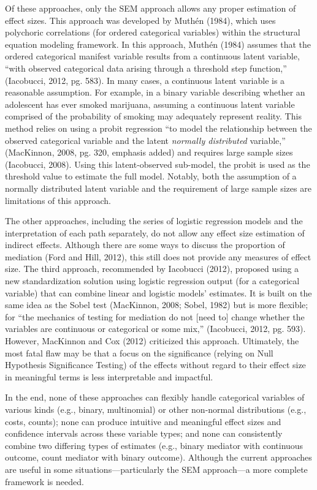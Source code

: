 \documentclass[]{DissertateUSU}
\begin{document}
Of these approaches, only the SEM approach allows any proper estimation
of effect sizes. This approach was developed by Muthén (1984), which
uses polychoric correlations (for ordered categorical variables) within
the structural equation modeling framework. In this approach, Muthén
(1984) assumes that the ordered categorical manifest variable results
from a continuous latent variable, ``with observed categorical data
arising through a threshold step function,'' (Iacobucci, 2012, pg. 583).
In many cases, a continuous latent variable is a reasonable assumption.
For example, in a binary variable describing whether an adolescent has
ever smoked marijuana, assuming a continuous latent variable comprised
of the probability of smoking may adequately represent reality. This
method relies on using a probit regression ``to model the relationship
between the observed categorical variable and the latent \emph{normally
distributed} variable,'' (MacKinnon, 2008, pg. 320, emphasis added) and
requires large sample sizes (Iacobucci, 2008). Using this
latent-observed sub-model, the probit is used as the threshold value to
estimate the full model. Notably, both the assumption of a normally
distributed latent variable and the requirement of large sample sizes
are limitations of this approach.

The other approaches, including the series of logistic regression models
and the interpretation of each path separately, do not allow any effect
size estimation of indirect effects. Although there are some ways to
discuss the proportion of mediation (Ford and Hill, 2012), this still
does not provide any measures of effect size. The third approach,
recommended by Iacobucci (2012), proposed using a new standardization
solution using logistic regression output (for a categorical variable)
that can combine linear and logistic models' estimates. It is built on
the same idea as the Sobel test (MacKinnon, 2008; Sobel, 1982) but is
more flexible; for ``the mechanics of testing for mediation do not
{[}need to{]} change whether the variables are continuous or categorical
or some mix,'' (Iacobucci, 2012, pg. 593). However, MacKinnon and Cox
(2012) criticized this approach. Ultimately, the most fatal flaw may be
that a focus on the significance (relying on Null Hypothesis
Significance Testing) of the effects without regard to their effect size
in meaningful terms is less interpretable and impactful.

In the end, none of these approaches can flexibly handle categorical
variables of various kinds (e.g., binary, multinomial) or other
non-normal distributions (e.g., costs, counts); none can produce
intuitive and meaningful effect sizes and confidence intervals across
these variable types; and none can consistently combine two differing
types of estimates (e.g., binary mediator with continuous outcome, count
mediator with binary outcome). Although the current approaches are
useful in some situations---particularly the SEM approach---a more
complete framework is needed.
\end{document}
